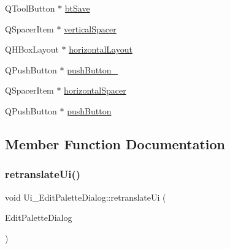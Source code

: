 \begin{DoxyCompactItemize}
\item 
Q\+Tool\+Button $\ast$ \mbox{\hyperlink{class_ui___edit_palette_dialog_a3e07f877f15a88dfc3ab0ae517972da6}{bt\+Save}}
\item 
Q\+Spacer\+Item $\ast$ \mbox{\hyperlink{class_ui___edit_palette_dialog_a38ffc740559fd7391b67f3de56678e81}{vertical\+Spacer}}
\item 
Q\+H\+Box\+Layout $\ast$ \mbox{\hyperlink{class_ui___edit_palette_dialog_a1544006231a9aac8a82a01e30d92a8a0}{horizontal\+Layout}}
\item 
Q\+Push\+Button $\ast$ \mbox{\hyperlink{class_ui___edit_palette_dialog_ac4246e6cd5513b149056a9ea221a02a6}{push\+Button\+\_}}
\item 
Q\+Spacer\+Item $\ast$ \mbox{\hyperlink{class_ui___edit_palette_dialog_a332d29bbe6b9e33802da230eefd45c9d}{horizontal\+Spacer}}
\item 
Q\+Push\+Button $\ast$ \mbox{\hyperlink{class_ui___edit_palette_dialog_a432cb3437165614d95376b3e2b7f6e65}{push\+Button}}
\end{DoxyCompactItemize}


\subsection{Member Function Documentation}
\mbox{\label{class_ui___edit_palette_dialog_a8926a59f5f1bf58a55282dd61c915278}} 
\subsubsection{\texorpdfstring{retranslateUi()}{retranslateUi()}}
{\footnotesize\ttfamily void Ui\+\_\+\+Edit\+Palette\+Dialog\+::retranslate\+Ui (\begin{DoxyParamCaption}\item[{Q\+Dialog $\ast$}]{Edit\+Palette\+Dialog }\end{DoxyParamCaption})\hspace{0.3cm}{\ttfamily [inline]}}

\mbox{\label{class_ui___edit_palette_dialog_afe5ba2f1fdfa4f5edc88c309d3ca1aad}} 
